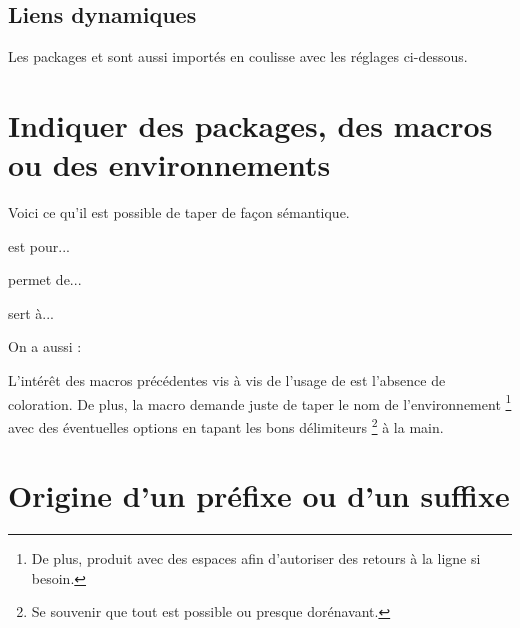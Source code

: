 
\subsection{Liens dynamiques}

Les packages  et  sont aussi importés en coulisse avec les réglages ci-dessous.

\begin{bdoclatex}[code]
\hypersetup{
  colorlinks,
  citecolor = orange!75!black,
  filecolor = orange!75!black,
  linkcolor = orange!75!black,
  urlcolor  = orange!75!black
}
\end{bdoclatex}


\section{Indiquer des packages, des macros ou des environnements}

Voici ce qu'il est possible de taper de façon sémantique.

\begin{bdoclatex}[sbs]
 est pour...

 permet de...

 sert à...

On a aussi :

\end{bdoclatex}


\begin{bdocrem}
    L'intérêt des macros précédentes vis à vis de l'usage de  est l'absence de coloration.
    De plus, la macro  demande juste de taper le nom de l'environnement
    \footnote{
        De plus,  produit  avec des espaces afin d'autoriser des retours à la ligne si besoin.
    }
    avec des éventuelles options en tapant les bons délimiteurs
    \footnote{
        Se souvenir que tout est possible ou presque dorénavant.
    }
    à la main.
\end{bdocrem}




\section{Origine d'un préfixe ou d'un suffixe}

